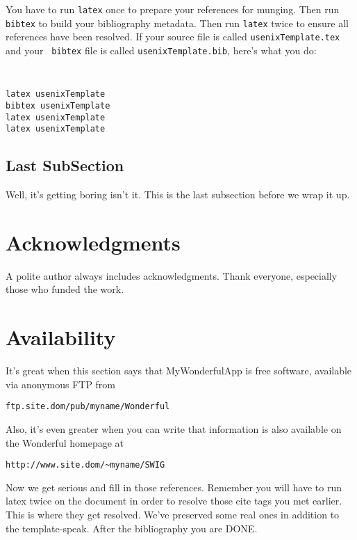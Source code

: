 \documentclass[letterpaper,twocolumn,10pt]{article}
\begin{document}
You have to run {\tt latex} once to prepare your references for
munging.  Then run {\tt bibtex} to build your bibliography metadata.
Then run {\tt latex} twice to ensure all references have been resolved.
If your source file is called {\tt usenixTemplate.tex} and your {\tt
  bibtex} file is called {\tt usenixTemplate.bib}, here's what you do:
{\tt \small
\begin{verbatim}
latex usenixTemplate
bibtex usenixTemplate
latex usenixTemplate
latex usenixTemplate
\end{verbatim}
}


\subsection{Last SubSection}

Well, it's getting boring isn't it.  This is the last subsection
before we wrap it up.

\section{Acknowledgments}

A polite author always includes acknowledgments.  Thank everyone,
especially those who funded the work. 

\section{Availability}

It's great when this section says that MyWonderfulApp is free software, 
available via anonymous FTP from

\begin{center}
{\tt ftp.site.dom/pub/myname/Wonderful}\\
\end{center}

Also, it's even greater when you can write that information is also 
available on the Wonderful homepage at 

\begin{center}
{\tt http://www.site.dom/\~{}myname/SWIG}
\end{center}

Now we get serious and fill in those references.  Remember you will
have to run latex twice on the document in order to resolve those
cite tags you met earlier.  This is where they get resolved.
We've preserved some real ones in addition to the template-speak.
After the bibliography you are DONE.

{\footnotesize 
}


\theendnotes
\end{document}
